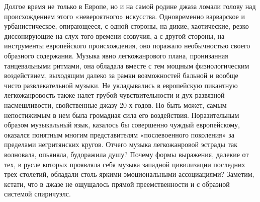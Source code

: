 Долгое  время  не  только  в  Европе,  но  и  на  самой  родине  джаза
ломали  голову  над  происхождением  этого  «невероятного»  искусства.
Одновременно  варварское  и   урбанистическое,  опирающееся,  с  одной
стороны,  на  дикие, хаотические,  резко  диссонирующие  на слух  того
времени  созвучия, а  с  другой стороны,  на инструменты  европейского
происхождения, оно поражало  необычностью своего образного содержания.
Музыка явно  легкожанрового плана, пронизанная  танцевальными ритмами,
она  обладала  вместе  с   тем  мощным  физиологическим  воздействием,
выходящим  далеко  за  рамки   возможностей  бальной  и  вообще  чисто
развлекательной  музыки.  Не   укладывались  в  европейскую  пикантную
легкожанровость также  налет грубой  чувствительности и  дух развязной
насмешливости,  свойственные джазу  20-х годов.  Но быть  может, самым
непостижимым в нем была  громадная сила его воздействия. Поразительным
образом музыкальный язык, казалось  бы совершенно чуждый европейскому,
оказался понятным  многим представителям «послевоенного  поколения» за
пределами негритянских кругов. Отчего музыка легкожанровой эстрады так
волновала, опьяняла, будоражила душу?  Почему формы выражения, далекие
от тех,  в русле  которых проявляла  себя музыка  западной цивилизации
последних   трех  столетий,   обладали  столь   яркими  эмоциональными
ассоциациями?  Заметим,  кстати,  что  в  джазе  не  ощущалось  прямой
преемственности и с образной системой спиричуэлс.

